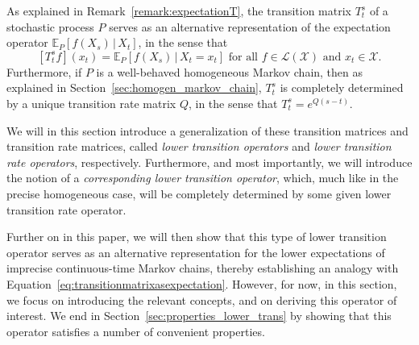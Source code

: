 \documentclass[10pt,a4paper]{paper}
\theoremstyle{definition}
\newcommand{\states}{\mathcal{X}}
\newcommand{\processes}{\mathbb{P}}
\newcommand{\wprocesses}{\processes^{\mathrm{W}}}
\newcommand{\wmprocesses}{\processes^{\mathrm{WM}}}
\newcommand{\gambles}{\mathcal{L}}
\newcommand{\gamblesX}{\gambles(\states)}
\newcommand{\rateset}{\mathcal{Q}}
\begin{document}

As explained in Remark~\ref{remark:expectationT}, the transition matrix $T_t^s$ of a stochastic process $P$ serves as an alternative representation of the expectation operator $\mathbb{E}_P[f(X_s)\,\vert\,X_t]$, in the sense that
\begin{equation}\label{eq:transitionmatrixasexpectation}
[T_t^sf](x_t)=\mathbb{E}_P[f(X_s)\,\vert\,X_t=x_t]
\text{ for all $f\in\gamblesX$ and $x_t\in\states$.}
\end{equation}
Furthermore, if $P$ is a well-behaved homogeneous Markov chain, then as explained in Section~\ref{sec:homogen_markov_chain}, $T_t^s$ is completely determined by a unique transition rate matrix $Q$, in the sense that $T_t^s=e^{Q(s-t)}$.

We will in this section introduce a generalization of these transition matrices and transition rate matrices, called \emph{lower transition operators} and \emph{lower transition rate operators}, respectively. Furthermore, and most importantly, we will introduce the notion of a \emph{corresponding lower transition operator}, which, much like in the precise homogeneous case, will be completely determined by some given lower transition rate operator. 

Further on in this paper, we will then  show that this type of lower transition operator serves as an alternative representation for the lower expectations of imprecise continuous-time Markov chains, thereby establishing an analogy with Equation~\eqref{eq:transitionmatrixasexpectation}. However, for now, in this section, we focus on introducing the relevant concepts, and on deriving this operator of interest. We end in Section~\ref{sec:properties_lower_trans} by showing that this operator satisfies a number of convenient properties.
\end{document}
